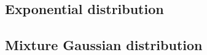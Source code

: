 \documentclass{article}
\begin{document}
\subsection{Exponential distribution}

\subsection{Mixture Gaussian distribution}
\end{document}
